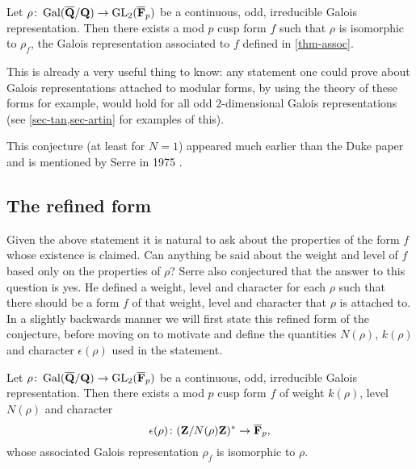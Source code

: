 \documentclass[a4paper,12pt]{article}
\begin{document}
\begin{conjecture}\label{conj-qual}
Let $\rho\colon \operatorname{Gal}(\overline{\mathbf{Q}}/\mathbf{Q}) \to \operatorname{GL}_2(\overline{\mathbf{F}}_p)$ be a continuous, odd, irreducible Galois representation.
Then there exists a mod $p$ cusp form $f$ such that $\rho$ is isomorphic to $\rho_f$, the Galois representation associated to $f$ defined in \cref{thm-assoc}.
\end{conjecture}

This is already a very useful thing to know: any statement one could prove about Galois representations attached to  modular forms, by using the theory of these forms for example, would hold for all odd 2-dimensional Galois representations (see \cref{sec-tan,sec-artin} for examples of this). %

This conjecture (at least for $N = 1$) appeared much earlier than the Duke paper and is mentioned by Serre in 1975 \cite{Serre75}.


\subsection{The refined form}
Given the above statement it is natural to ask about the properties of the form $f$ whose existence is claimed.
Can anything be said about the weight and level of $f$ based only on the properties of $\rho$?
Serre also conjectured that the answer to this question is yes.
He defined a weight, level and character for each $\rho$ such that there should be a form $f$ of that weight, level and character that $\rho$ is attached to.
In a slightly backwards manner we will first state this refined form of the conjecture, before moving on to motivate and define the quantities $N(\rho)$, $k(\rho)$ and character $\epsilon(\rho)$ used in the statement.

\begin{conjecture}\label{conj-ref}
Let $\rho\colon \operatorname{Gal}(\overline{\mathbf{Q}}/\mathbf{Q}) \to \operatorname{GL}_2(\overline{\mathbf{F}}_p)$ be a continuous, odd, irreducible Galois representation.
Then there exists a mod $p$ cusp form $f$ of weight $k(\rho)$, level $N(\rho)$ and character
\[
\epsilon(\rho)\colon (\mathbf{Z}/N(\rho)\mathbf{Z})^* \to \overline{\mathbf{F}}_p,
\]
whose associated Galois representation $\rho_f$ is isomorphic to $\rho$.
\end{conjecture}

\end{document}
